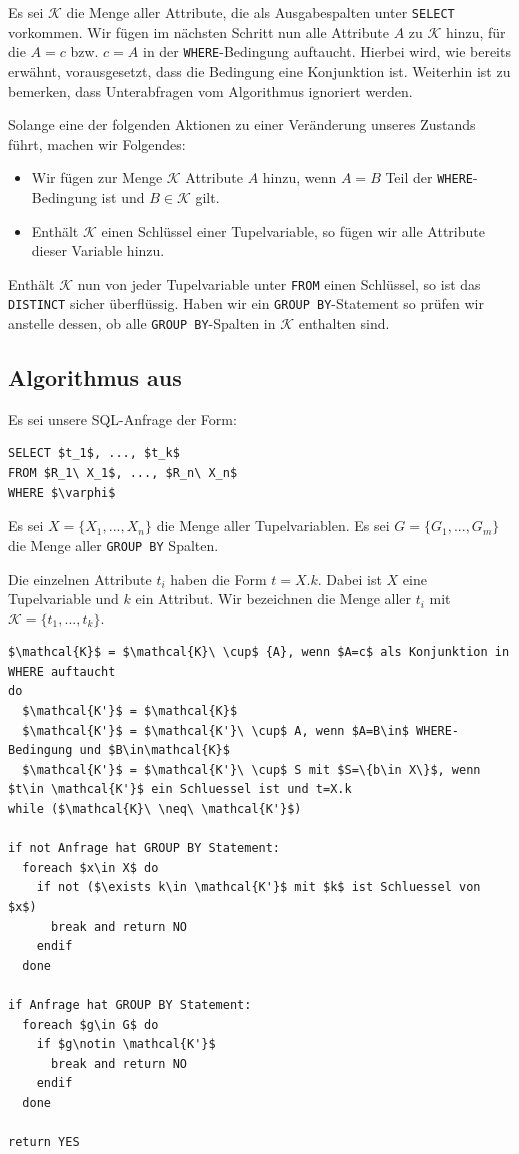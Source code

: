 Es sei $\mathcal{K}$ die Menge aller Attribute, die als Ausgabespalten unter \verb|SELECT| vorkommen.
Wir fügen im nächsten Schritt nun alle Attribute $A$ zu $\mathcal{K}$ hinzu, für die $A=c$ bzw. $c=A$ in der \verb|WHERE|-Bedingung auftaucht. Hierbei wird, wie bereits erwähnt, vorausgesetzt, dass die Bedingung eine Konjunktion ist. Weiterhin ist zu bemerken, dass Unterabfragen vom Algorithmus ignoriert werden.

Solange eine der folgenden Aktionen zu einer Veränderung unseres Zustands führt, machen wir Folgendes:
\begin{itemize}
\item Wir fügen zur Menge $\mathcal{K}$ Attribute $A$ hinzu, wenn $A=B$ Teil der \verb|WHERE|-Bedingung ist und $B\in \mathcal{K}$ gilt.
\item Enthält $\mathcal{K}$ einen Schlüssel einer Tupelvariable, so fügen wir alle Attribute dieser Variable hinzu.
\end{itemize}

Enthält $\mathcal{K}$ nun von jeder Tupelvariable unter \verb|FROM| einen Schlüssel, so ist das \verb|DISTINCT| sicher überflüssig. Haben wir ein \verb|GROUP BY|-Statement so prüfen wir anstelle dessen, ob alle \verb|GROUP BY|-Spalten in $\mathcal{K}$ enthalten sind.

\subsection{Algorithmus aus \cite{sql1folien}}

Es sei unsere SQL-Anfrage der Form:

\begin{lstlisting}[mathescape]
SELECT $t_1$, ..., $t_k$
FROM $R_1\ X_1$, ..., $R_n\ X_n$
WHERE $\varphi$
\end{lstlisting}

Es sei $X=\{X_1, ..., X_n\}$ die Menge aller Tupelvariablen. Es sei $G=\{G_1, ..., G_m\}$ die Menge aller \verb|GROUP BY| Spalten.

Die einzelnen Attribute $t_i$ haben die Form $t = X.k$. Dabei ist $X$ eine Tupelvariable und $k$ ein Attribut. Wir bezeichnen die Menge aller $t_i$ mit $\mathcal{K}=\{t_1,...,t_k\}$.

\begin{lstlisting}[mathescape]
$\mathcal{K}$ = $\mathcal{K}\ \cup$ {A}, wenn $A=c$ als Konjunktion in WHERE auftaucht
do 
  $\mathcal{K'}$ = $\mathcal{K}$
  $\mathcal{K'}$ = $\mathcal{K'}\ \cup$ A, wenn $A=B\in$ WHERE-Bedingung und $B\in\mathcal{K}$
  $\mathcal{K'}$ = $\mathcal{K'}\ \cup$ S mit $S=\{b\in X\}$, wenn $t\in \mathcal{K'}$ ein Schluessel ist und t=X.k
while ($\mathcal{K}\ \neq\ \mathcal{K'}$)

if not Anfrage hat GROUP BY Statement:
  foreach $x\in X$ do
    if not ($\exists k\in \mathcal{K'}$ mit $k$ ist Schluessel von $x$)
      break and return NO
    endif
  done

if Anfrage hat GROUP BY Statement:
  foreach $g\in G$ do
    if $g\notin \mathcal{K'}$
      break and return NO
    endif
  done

return YES
\end{lstlisting}


